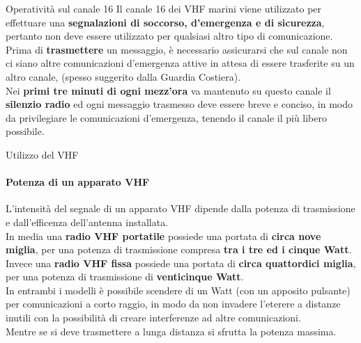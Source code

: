 \documentclass[aspectratio=169]{beamer}
\begin{document}
\begin{frame}{Operatività sul canale 16}
	Il canale 16 dei VHF marini viene utilizzato per effettuare una \textbf{segnalazioni di soccorso, d'emergenza e di sicurezza}, pertanto non deve essere utilizzato per qualsiasi altro tipo di comunicazione.\\
	\smallskip
	Prima di \textbf{trasmettere} un messaggio, è necessario assicurarsi che sul canale non ci siano altre comunicazioni d'emergenza attive in attesa di essere trasferite su un altro canale, (spesso suggerito dalla Guardia Costiera).\\
	\smallskip
	Nei \textbf{ primi tre minuti di ogni mezz'ora} va mantenuto su questo canale il \textbf{silenzio radio} ed ogni messaggio trasmesso deve essere breve e conciso,  in modo da privilegiare le comunicazioni d'emergenza, tenendo il canale il più libero possibile.
\end{frame}

\begin{frame}{Utilizzo del VHF}
	\framesubtitle{Potenza di un apparato VHF}
	L'intensità del segnale di un apparato VHF dipende dalla potenza di trasmissione e dall'efficenza dell'antenna installata.\\
	\smallskip
	In media una \textbf{radio VHF portatile} possiede una portata di \textbf{circa nove miglia}, per una potenza di trasmissione compresa \textbf{tra i tre ed i cinque Watt}.\\
	Invece una \textbf{radio VHF fissa} possiede una portata di \textbf{circa quattordici miglia}, per una potenza di trasmissione di \textbf{venticinque Watt}.\\
	\smallskip
	In entrambi i modelli è possibile scendere di un Watt (con un apposito pulsante) per comunicazioni a corto raggio, in modo da non invadere l'eterere a distanze inutili con la possibilità di creare interferenze ad altre comunicazioni. \\
	Mentre se si deve trasmettere a lunga distanza si sfrutta la potenza massima.\\
\end{frame}
\end{document}

